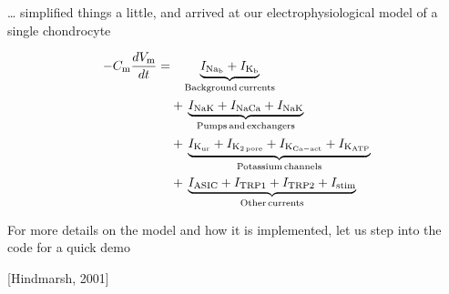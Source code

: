 \documentclass{beamer}
\newcommand{\references}[1] {
  \begin{flushright}
    \scriptsize [#1] \normalsize
  \end{flushright}
}
\begin{document}
\begin{frame}{\ldots{} simplified things a little, and arrived at our
    electrophysiological model of a single chondrocyte}

  \begin{equation*}
    \begin{split}
      -C_{\rm m} \frac{dV_{\rm m}}{dt} = & \phantom{+\,} \underbrace{I_{\rm Na_b} + I_{\rm K_b}}_{\rm Background\, currents}\\
      & +\, \underbrace{I_{\rm NaK} + I_{\rm NaCa} + I_{\rm NaK}}_{\rm Pumps\, and\, exchangers}\\
      & +\, \underbrace{I_{\rm K_{ur}} + I_{\rm K_{2\, pore}} + I_{\rm K_{Ca-act}} + I_{\rm K_{ATP}}}_{\rm Potassium\, channels}\\
      & +\, \underbrace{I_{\rm ASIC} + I_{\rm TRP1} + I_{\rm TRP2} + I_{\rm stim}}_{\rm Other\, currents}
    \end{split}
  \end{equation*}

  \vspace{0.5cm}
  \pause
  For more details on the model and how it is implemented, let us step
  into the code for a quick demo

  \references{Hindmarsh, 2001}

\end{frame}



%
\end{document}
